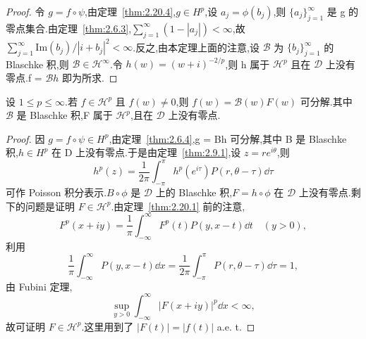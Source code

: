 \begin{proof}
令 $g = f \circ \psi$,由定理~\ref{thm:2.20.4},$g \in H^{p}$,设 $a_{j} = \phi(b_{j})$,则 $\{a_{j}\}_{j=1}^{\infty}$ 是 g 的零点集合.由定理~\ref{thm:2.6.3},$\sum_{j=1}^{\infty}(1 - |a_{j}|) < \infty$,故 $\sum_{j=1}^{\infty}\mathrm{Im}(b_{j})/|i + b_{j}|^{2} < \infty$.反之,由本定理上面的注意,设 $\mathcal{B}$ 为 $\{b_{j}\}_{j=1}^{\infty}$ 的 Blaschke 积,则 $\mathcal{B} \in \mathcal{H}^{\infty}$.令 $h(w) = (w + i)^{-2/p}$,则 h 属于 $\mathcal{H}^{p}$ 且在 $\mathcal{D}$ 上没有零点.f = $\mathcal{B}h$ 即为所求.
\end{proof}

\begin{theorem}\label{thm:2.20.7}
设 $1 \leq p \leq \infty$.若 $f \in \mathcal{H}^{p}$ 且 $f(w) \neq 0$,则 $f(w) = \mathcal{B}(w)F(w)$ 可分解.其中 $\mathcal{B}$ 是 Blaschke 积,F 属于 $\mathcal{H}^{p}$,且在 $\mathcal{D}$ 上没有零点.
\end{theorem}

\begin{proof}
因 $g = f \circ \psi \in H^{p}$,由定理~\ref{thm:2.6.4},g = Bh 可分解,其中 B 是 Blaschke 积,$h \in H^{p}$ 在 D 上没有零点.于是由定理~\ref{thm:2.9.1},设 $z = re^{i\theta}$,则
\begin{equation*}
h^{p}(z) = \frac{1}{2\pi}\int_{-\pi}^{\pi} h^{p}(e^{i\tau})P(r, \theta - \tau)\dd \tau
\end{equation*}
可作 Poisson 积分表示.$B \circ \phi$ 是 $\mathcal{D}$ 上的 Blaschke 积,$F = h \circ \phi$ 在 $\mathcal{D}$ 上没有零点.剩下的问题是证明 $F \in \mathcal{H}^{p}$.由定理~\ref{thm:2.20.1} 前的注意,
\begin{equation*}
F^{p}(x + iy) = \frac{1}{\pi}\int_{-\infty}^{\infty} F^{p}(t)P(y, x - t)\dd t \quad (y > 0),
\end{equation*}
利用
\begin{equation*}
\frac{1}{\pi}\int_{-\infty}^{\infty} P(y, x - t)\dd x = \frac{1}{2\pi}\int_{-\pi}^{\pi} P(r, \theta - \tau)\dd \tau = 1,
\end{equation*}
由 Fubini 定理,
\begin{equation*}
\sup_{y > 0}\int_{-\infty}^{\infty}|F(x + iy)|^{p}\dd x < \infty,
\end{equation*}
故可证明 $F \in \mathcal{H}^{p}$.这里用到了 $|F(t)| = |f(t)|$ a.e. t.
\end{proof}

